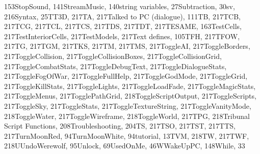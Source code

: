 \documentclass[
]{article}
\begin{document}
153StopSound, 141StreamMusic, 140string variables, 27Subtraction, 30sv,
216Syntax, 25TT3D, 217TA, 217Talked to PC (dialogue), 111TB, 217TCB,
217TCG, 217TCL, 217TCS, 217TDS, 217TDT, 217TESAME, 163TestCells,
217TestInteriorCells, 217TestModels, 217Text defines, 105TFH, 217TFOW,
217TG, 217TGM, 217TKS, 217TM, 217TMS, 217ToggleAI, 217ToggleBorders,
217ToggleCollision, 217ToggleCollisionBoxes, 217ToggleCollisionGrid,
217ToggleCombatStats, 217ToggleDebugText, 217ToggleDialogueStats,
217ToggleFogOfWar, 217ToggleFullHelp, 217ToggleGodMode, 217ToggleGrid,
217ToggleKillStats, 217ToggleLights, 217ToggleLoadFade,
217ToggleMagicStats, 217ToggleMenus, 217TogglePathGrid,
218ToggleScriptOutput, 217ToggleScripts, 217ToggleSky, 217ToggleStats,
217ToggleTextureString, 217ToggleVanityMode, 218ToggleWater,
217ToggleWireframe, 218ToggleWorld, 217TPG, 218Tribunal Script
Functions, 208Troubleshooting, 204TS, 217TSO, 217TST, 217TTS,
217TurnMoonRed, 94TurnMoonWhite, 94tutorial, 13TVM, 218TW, 217TWF,
218UUndoWerewolf, 95Unlock, 69UsedOnMe, 46WWakeUpPC, 148While, 33
\end{document}
